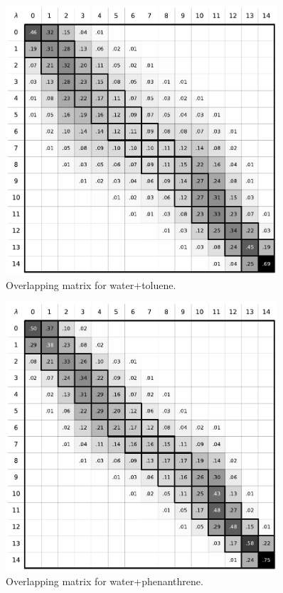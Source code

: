 \documentclass[
	12pt,				%
	openright,			%
	oneside,			%
	a4paper,			%
	english,			%
	brazil				%
	]{abntex2}
\begin{document}
\begin{apendicesenv}
\begin{figure}[H]
	\centering
	\includegraphics[width=0.9\textwidth]{Figures/owat_tol}
	\caption{Overlapping matrix for water+toluene.}
\end{figure}

\begin{figure}[H]
	\centering
	\includegraphics[width=0.9\textwidth]{Figures/owat_phen}
	\caption{Overlapping matrix for water+phenanthrene.}
\end{figure}

\end{apendicesenv}
\end{document}
